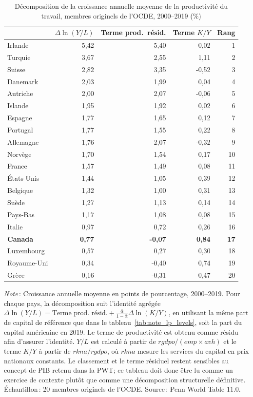 \begin{table}[tbp]
\centering
\sffamily
\footnotesize
\renewcommand{\arraystretch}{1.06}
\begin{threeparttable}
\caption{D\'ecomposition de la croissance annuelle moyenne de la productivit\'e du travail, membres originels de l'OCDE, 2000--2019 (\%)}
\label{tab:note_international}
\begin{tabular}{l *{4}{r}}
\toprule
& $\Delta \ln(Y/L)$ & Terme prod.\ r\'esid. & Terme $K/Y$ & Rang \\
\midrule
Irlande & 5,42 & 5,40 & 0,02 & 1 \\
Turquie & 3,67 & 2,55 & 1,11 & 2 \\
Suisse & 2,82 & 3,35 & -0,52 & 3 \\
Danemark & 2,03 & 1,99 & 0,04 & 4 \\
Autriche & 2,00 & 2,07 & -0,06 & 5 \\
Islande & 1,95 & 1,92 & 0,02 & 6 \\
Espagne & 1,77 & 1,65 & 0,12 & 7 \\
Portugal & 1,77 & 1,55 & 0,22 & 8 \\
Allemagne & 1,76 & 2,07 & -0,32 & 9 \\
Norvège & 1,70 & 1,54 & 0,17 & 10 \\
France & 1,57 & 1,49 & 0,08 & 11 \\
États-Unis & 1,44 & 1,05 & 0,39 & 12 \\
Belgique & 1,32 & 1,00 & 0,31 & 13 \\
Suède & 1,27 & 1,13 & 0,14 & 14 \\
Pays-Bas & 1,17 & 1,08 & 0,08 & 15 \\
Italie & 0,97 & 0,72 & 0,26 & 16 \\
\textbf{Canada} & \textbf{0,77} & \textbf{-0,07} & \textbf{0,84} & \textbf{17} \\
Luxembourg & 0,57 & 0,27 & 0,30 & 18 \\
Royaume-Uni & 0,34 & -0,40 & 0,74 & 19 \\
Grèce & 0,16 & -0,31 & 0,47 & 20 \\
\bottomrule
\end{tabular}
\begin{tablenotes}\footnotesize
\item \textit{Note}\,: Croissance annuelle moyenne en points de pourcentage, 2000--2019. Pour chaque pays, la d\'ecomposition suit l'identit\'e agr\'eg\'ee $\Delta \ln(Y/L) = \text{Terme prod.\ r\'esid.} + \frac{\bar\alpha}{1-\bar\alpha}\Delta \ln(K/Y)$, en utilisant la m\^eme part de capital de r\'ef\'erence que dans le tableau~\ref{tab:note_lp_levels}, soit la part du capital am\'ericaine en 2019. Le terme de productivit\'e est obtenu comme r\'esidu afin d'assurer l'identit\'e. $Y/L$ est calcul\'e \`a partir de $rgdpo/(emp \times avh)$ et le terme $K/Y$ \`a partir de $rkna/rgdpo$, o\`u $rkna$ mesure les services du capital en prix nationaux constants. Le classement et le terme r\'esiduel restent sensibles au concept de PIB retenu dans la PWT; ce tableau doit donc \^etre lu comme un exercice de contexte plut\^ot que comme une d\'ecomposition structurelle d\'efinitive. \'Echantillon\,: 20 membres originels de l'OCDE. Source\,: Penn World Table 11.0.

\end{tablenotes}
\end{threeparttable}
\end{table}
